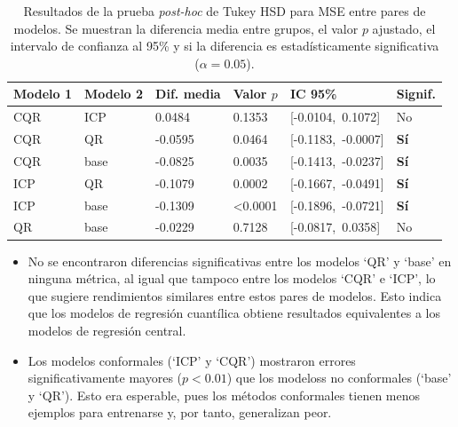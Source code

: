 \renewcommand{\arraystretch}{1.2}
\begin{table}[h]
    \small
    \centering
    \begin{tabular}{llllll}
    \toprule
    \textbf{Modelo 1} & \textbf{Modelo 2} & \textbf{Dif. media} & \textbf{Valor $p$} & \textbf{IC 95\%} & \textbf{Signif.} \\
    \midrule
    CQR  & ICP   & 0.0484  & 0.1353   & [-0.0104,\ 0.1072]     & No            \\
    CQR  & QR    & -0.0595 & 0.0464   & [-0.1183,\ -0.0007]    & \textbf{Sí}   \\
    CQR  & base  & -0.0825 & 0.0035   & [-0.1413,\ -0.0237]    & \textbf{Sí}   \\
    ICP  & QR    & -0.1079 & 0.0002   & [-0.1667,\ -0.0491]    & \textbf{Sí}   \\
    ICP  & base  & -0.1309 & \textless 0.0001  & [-0.1896,\ -0.0721]    & \textbf{Sí}   \\
    QR   & base  & -0.0229 & 0.7128   & [-0.0817,\ 0.0358]     & No            \\
    \bottomrule
    \end{tabular}
    \caption[
        Resultados de la prueba \textit{post-hoc} de Tukey HSD para MSE entre pares de modelos.
    ]{
        Resultados de la prueba \textit{post-hoc} de Tukey HSD para MSE entre pares de modelos. 
        Se muestran la diferencia media entre grupos, el valor $p$ ajustado, el intervalo de confianza al 95\% y si la diferencia es estadísticamente significativa ($\alpha = 0.05$).
    }
    \label{tab:AE_tukey_mse}
\end{table}

\begin{itemize}
    
    \item No se encontraron diferencias significativas entre los modelos `QR' y `base' en ninguna métrica, al igual que tampoco entre los modelos `CQR' e `ICP', lo que sugiere rendimientos similares entre estos pares de modelos. Esto indica que los modelos de regresión cuantílica obtiene resultados equivalentes a los modelos de regresión central.  

    \item Los modelos conformales (`ICP' y `CQR') mostraron errores significativamente mayores ($p<0.01$) que los modeloss no conformales (`base' y `QR'). Esto era esperable, pues los métodos conformales tienen menos ejemplos para entrenarse y, por tanto, generalizan peor. 

\end{itemize}


